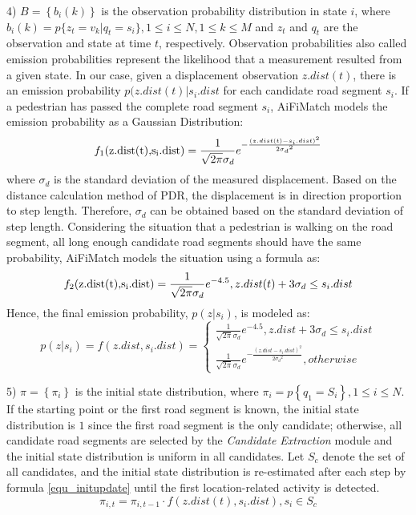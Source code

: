 \documentclass[conference]{IEEEtran}
\begin{document}
4) $B = \left\{ {{b_i}(k)} \right\}$ is the observation probability distribution in state $i$, where ${b_i}(k) = p\{ {z_t} = {v_k}|{q_t} = {s_i}\},1 \le i \le N,1 \le k \le M$ and $z_t$ and $q_t$ are the observation and state at time $t$, respectively. Observation probabilities also called emission probabilities represent the likelihood that a measurement resulted from a given state. In our case, given a displacement observation $z.dist(t)$, there is an emission probability $p(z.dist(t)|{s_i}.dist$ for each candidate road segment $s_i$. If a pedestrian has passed the complete road segment $s_i$, AiFiMatch models the emission probability as a Gaussian Distribution:
\begin{equation}
\label{equ_emission1}
{f_1}({\rm{z}}{\rm{.dist(t),}}{{\rm{s}}_{\rm{i}}}{\rm{.dist}}) = \frac{1}{{\sqrt {2\pi } {\sigma _d}}}{e^{ - \frac{{{{(z.dist(t) - {s_i}.dist)}^2}}}{{2{\sigma _d}^2}}}}
\end{equation}
where $\sigma _d$ is the standard deviation of the measured displacement. Based on the distance calculation method of PDR, the displacement is in direction proportion to step length. Therefore, $\sigma _d$ can be obtained based on the standard deviation of step length. Considering the situation that a pedestrian is walking on the road segment, all long enough candidate road segments should have the same probability, AiFiMatch models the situation using a formula as:
\begin{equation}
{f_2}({\rm{z}}{\rm{.dist(t),}}{{\rm{s}}_{\rm{i}}}{\rm{.dist}}) = \frac{1}{{\sqrt {2\pi } {\sigma _d}}}{e^{-4.5}},z.dist(t) + 3{\sigma _d} \le {s_i}.dist
\end{equation}
Hence, the final emission probability, $p(z|s_i)$, is modeled as:
\begin{equation}
p(z|s_i)=f(z.dist,{s_i}.dist) = \left\{ {\begin{array}{*{20}{l}}
	{\frac{1}{{\sqrt {2\pi } {\sigma _d}}}{e^{-4.5}},z.dist + 3{\sigma _d} \le {s_i}.dist}\\
	{\frac{1}{{\sqrt {2\pi } {\sigma _d}}}{e^{ - \frac{{{{(z.dist - {s_i}.dist)}^2}}}{{2{\sigma _d}^2}}}},otherwise}
	\end{array}} \right.
\end{equation}

5) $\pi  = \left\{ {{\pi _i}} \right\}$ is the initial state distribution, where ${\pi _i} = p\left\{ {{q_1} = {S_i}} \right\},1 \le i \le N$. If the starting point or the first road segment is known, the initial state distribution is $1$ since the first road segment is the only candidate; otherwise, all candidate road segments are selected by the \emph{Candidate Extraction} module and the initial state distribution is uniform in all candidates. Let $S_c$ denote the set of all candidates, and the initial state distribution is re-estimated after each step by formula \ref{equ_initupdate} until the first location-related activity is detected.
\begin{equation}
\label{equ_initupdate}
{\pi _{i,t}} = {\pi _{i,t - 1}} \cdot f(z.dist(t),{s_i}.dist),{s_i} \in {S_c}
\end{equation}
\end{document}
